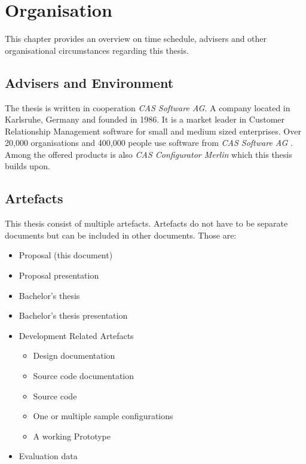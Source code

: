 \chapter{Organisation}
\label{ch:Organisation}

This chapter provides an overview on time schedule, advisers and other organisational circumstances regarding this thesis.

\section{Advisers and Environment}
\label{sec:Organisation:AdvisersAndEnvironment}

The thesis is written in cooperation \emph{CAS Software AG}. A company located in Karlsruhe, Germany and founded in 1986. It is a market leader in Customer Relationship Management software for small and medium sized enterprises. Over 20,000 organisations and 400,000 people use software from \emph{CAS Software AG} \cite{CASSoftwareAG}. Among the offered products is also \emph{CAS Configurator Merlin} which this thesis builds upon.


\section{Artefacts}
\label{sec:Organisation:Artefacts}

This thesis consist of multiple artefacts. Artefacts do not have to be separate documents but can be included in other documents. Those are:
\begin{itemize}
    \item Proposal (this document)
    \item Proposal presentation
    \item Bachelor's thesis
    \item Bachelor's thesis presentation
    \item Development Related Artefacts
    \begin{itemize}
        \item Design documentation
        \item Source code documentation
        \item Source code
        \item One or multiple sample configurations
        \item A working Prototype
    \end{itemize}
    \item Evaluation data
\end{itemize}


